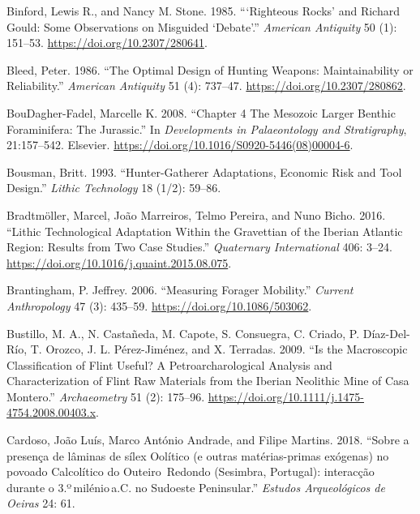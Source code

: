 \documentclass[
  a4paper,
  DIV=11,
  numbers=noendperiod]{scrreprt}
\newlength{\cslhangindent}
\newenvironment{CSLReferences}[2] %
 {\begin{list}{}{%
  \setlength{\itemindent}{0pt}
  \setlength{\leftmargin}{0pt}
  \setlength{\parsep}{0pt}
  \ifodd #1
   \setlength{\leftmargin}{\cslhangindent}
   \setlength{\itemindent}{-1\cslhangindent}
  \fi
  \setlength{\itemsep}{#2\baselineskip}}}
 {\end{list}}
\begin{document}
\begin{CSLReferences}{1}{0}
Binford, Lewis R., and Nancy M. Stone. 1985. {``{`{Righteous Rocks}'}
and {Richard Gould}: {Some Observations} on {Misguided} {`{Debate}'}.''}
\emph{American Antiquity} 50 (1): 151--53.
\url{https://doi.org/10.2307/280641}.

Bleed, Peter. 1986. {``The {Optimal Design} of {Hunting Weapons}:
{Maintainability} or {Reliability}.''} \emph{American Antiquity} 51 (4):
737--47. \url{https://doi.org/10.2307/280862}.

BouDagher-Fadel, Marcelle K. 2008. {``Chapter 4 {The Mesozoic} Larger
Benthic Foraminifera: The {Jurassic}.''} In \emph{Developments in
{Palaeontology} and {Stratigraphy}}, 21:157--542. Elsevier.
\url{https://doi.org/10.1016/S0920-5446(08)00004-6}.

Bousman, Britt. 1993. {``Hunter-Gatherer Adaptations, Economic Risk and
Tool Design.''} \emph{Lithic Technology} 18 (1/2): 59--86.

Bradtmöller, Marcel, João Marreiros, Telmo Pereira, and Nuno Bicho.
2016. {``Lithic Technological Adaptation Within the {Gravettian} of the
{Iberian Atlantic} Region: {Results} from Two Case Studies.''}
\emph{Quaternary International} 406: 3--24.
\url{https://doi.org/10.1016/j.quaint.2015.08.075}.

Brantingham, P. Jeffrey. 2006. {``Measuring {Forager Mobility}.''}
\emph{Current Anthropology} 47 (3): 435--59.
\url{https://doi.org/10.1086/503062}.

Bustillo, M. A., N. Castañeda, M. Capote, S. Consuegra, C. Criado, P.
Díaz-Del-Río, T. Orozco, J. L. Pérez-Jiménez, and X. Terradas. 2009.
{``Is the Macroscopic Classification of Flint Useful? {A}
Petroarcharological Analysis and Characterization of Flint Raw Materials
from the {Iberian} Neolithic Mine of {Casa Montero}.''}
\emph{Archaeometry} 51 (2): 175--96.
\url{https://doi.org/10.1111/j.1475-4754.2008.00403.x}.

Cardoso, João Luís, Marco António Andrade, and Filipe Martins. 2018.
{``{Sobre a presen{ç}a de l{â}minas de s{í}lex Ool{í}tico (e outras
mat{é}rias-primas ex{ó}genas) no povoado Calcol{í}tico do
Outeiro~Redondo (Sesimbra, Portugal): interac{ç}{ã}o durante o
3.º mil{é}nio a.C. no Sudoeste Peninsular}.''} \emph{Estudos
Arqueol{ó}gicos de Oeiras} 24: 61.


\end{CSLReferences}
\end{document}
